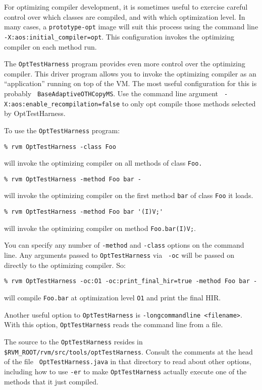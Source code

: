 For optimizing compiler development, it is sometimes useful to exercise
careful control over which classes are compiled, and with which
optimization level.  In many cases, a {\tt prototype-opt} image will
suit this process using the command line {\tt
-X:aos:initial\_compiler=opt}.  This configuration invokes the
optimizing compiler on each method run. 

The {\tt OptTestHarness} program provides even more control over the
optimizing compiler.  This driver program allows you to invoke the
optimizing compiler as an ``application'' running on top of the VM.
The most useful configuration for this is probably {\tt
BaseAdaptiveOTHCopyMS}. Use the command line argument {\tt
-X:aos:enable\_recompilation=false} to only opt compile those methods
selected by OptTestHarness. 

To use the {\tt OptTestHarness} program:
\begin{verbatim}
% rvm OptTestHarness -class Foo
\end{verbatim}
will invoke the optimizing compiler on all methods of class {\tt Foo.}

\begin{verbatim}
% rvm OptTestHarness -method Foo bar - 
\end{verbatim}
will invoke the optimizing compiler on the first method {\tt bar} of class
{\tt Foo} it loads.

\begin{verbatim}
% rvm OptTestHarness -method Foo bar '(I)V;' 
\end{verbatim} 
will invoke the optimizing compiler on method {\tt Foo.bar(I)V;}.

You can specify any number of {\tt -method} and {\tt -class} options on
the command line.  Any arguments passed to {\tt OptTestHarness} via {\tt
-oc} will be passed on directly to the optimizing compiler.  So:

\begin{verbatim}
% rvm OptTestHarness -oc:O1 -oc:print_final_hir=true -method Foo bar -
\end{verbatim} 
will compile {\tt Foo.bar} at optimization level {\tt O1} and print
the final HIR.

Another useful option to {\tt OptTestHarness} is {\tt -longcommandline
<filename>}. With this option, {\tt OptTestHarness} reads the command line
from a file.

The source to the {\tt OptTestHarness} resides in
{\tt \$RVM\_ROOT/rvm/src/tools/optTestHarness}.  Consult the comments
at the head of the file {\tt
OptTestHarness.java} in that directory to read about other options,
including how to use {\tt -er} to make {\tt OptTestHarness} 
actually execute one of the methods that it just compiled.
